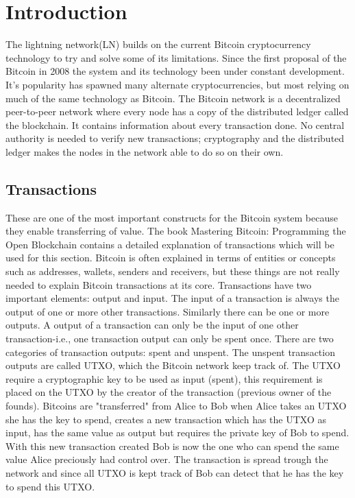 \documentclass[informationsecurity]{gucmasterproject}
\begin{document}
\chapter{Introduction}

The lightning network(LN) builds on the current Bitcoin cryptocurrency technology to try and solve some of its limitations.
Since the first proposal of the Bitcoin in 2008\cite{nakamoto2008bitcoin} the system and its technology been under constant development. It's popularity has spawned many alternate cryptocurrencies, but most relying on much of the same technology as Bitcoin. The Bitcoin network is a decentralized peer-to-peer network where every node has a copy of the distributed ledger called the blockchain. It contains information about every transaction done. No central authority is needed to verify new transactions; cryptography and the distributed ledger makes the nodes in the network able to do so on their own.

\section{Transactions}
These are one of the most important constructs for the Bitcoin system because they enable transferring of value. The book Mastering Bitcoin: Programming the Open Blockchain \cite{antonopoulos2017mastering} contains a detailed explanation of transactions which will be used for this section. Bitcoin is often explained in terms of entities or concepts such as addresses, wallets, senders and receivers, but these things are not really needed to explain Bitcoin transactions at its core. Transactions have two important elements: output and input. The input of a transaction is always the output of one or more other transactions. Similarly there can be one or more outputs. A output of a transaction can only be the input of one other transaction-i.e., one transaction output can only be spent once. There are two categories of transaction outputs: spent and unspent. The unspent transaction outputs are called UTXO, which the Bitcoin network keep track of. The UTXO require a cryptographic key to be used as input (spent), this requirement is placed on the UTXO by the creator of the transaction (previous owner of the founds). Bitcoins are "transferred" from Alice to Bob when Alice takes an UTXO she has the key to spend, creates a new transaction which has the UTXO as input, has the same value as output but requires the private key of Bob to spend. 
With this new transaction created Bob is now the one who can spend the same value Alice preciously had control over.
The transaction is spread trough the network and since all UTXO is kept track of Bob can detect that he has the key to spend this UTXO.
\end{document}
